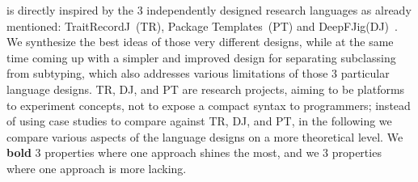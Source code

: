\name is directly inspired by the $3$ independently designed research languages as already mentioned:
 TraitRecordJ~(TR)\cite{Bettini:2010:ISP:1774088.1774530}, Package Templates~(PT)\cite{KrogdahlMS09} and DeepFJig(DJ)~\cite{deep}.
We synthesize
the best ideas of those very different designs, while at the same time 
coming up with a simpler and improved design for separating
subclassing from subtyping, which also addresses various limitations of those
$3$ particular language designs.
TR, DJ, and PT are research projects, aiming to 
be platforms to experiment concepts, not to expose a compact syntax to programmers;
instead of using case studies to compare \name against TR, DJ, and PT,
in the following we compare 
various aspects of the language designs on a more theoretical level.
We \textbf{bold} $3$ properties where one approach shines the most,
 and we  $3$ properties where one approach is more lacking.
